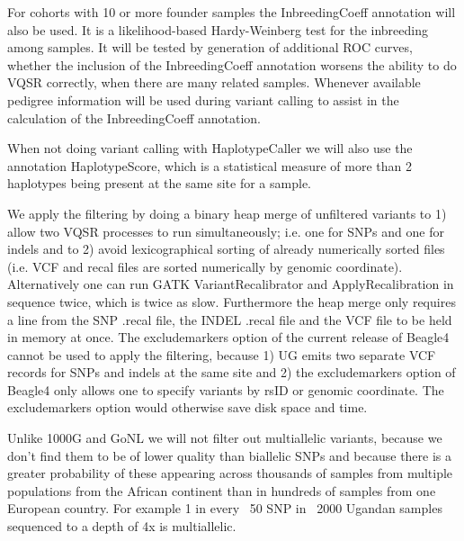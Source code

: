 For cohorts with 10 or more founder samples the InbreedingCoeff annotation will also be used. It is a likelihood-based Hardy-Weinberg test for the inbreeding among samples. It will be tested by generation of additional ROC curves, whether the inclusion of the InbreedingCoeff annotation worsens the ability to do VQSR correctly, when there are many related samples. Whenever available pedigree information will be used during variant calling to assist in the calculation of the InbreedingCoeff annotation.

When not doing variant calling with HaplotypeCaller we will also use the annotation HaplotypeScore, which is a statistical measure of more than 2 haplotypes being present at the same site for a sample.

We apply the filtering by doing a binary heap merge of unfiltered variants to 1) allow two VQSR processes to run simultaneously; i.e. one for SNPs and one for indels and to 2) avoid lexicographical sorting of already numerically sorted files (i.e. VCF and recal files are sorted numerically by genomic coordinate). Alternatively one can run GATK VariantRecalibrator and ApplyRecalibration in sequence twice, which is twice as slow. Furthermore the heap merge only requires a line from the SNP .recal file, the INDEL .recal file and the VCF file to be held in memory at once.
The excludemarkers option of the current release of Beagle4 cannot be used to apply the filtering, because 1) UG emits two separate VCF records for SNPs and indels at the same site and 2) the excludemarkers option of Beagle4 only allows one to specify variants by rsID or genomic coordinate. The excludemarkers option would otherwise save disk space and time.

Unlike 1000G and GoNL we will not filter out multiallelic variants, because we don't find them to be of lower quality than biallelic SNPs and because there is a greater probability of these appearing across thousands of samples from multiple populations from the African continent than in hundreds of samples from one European country. For example 1 in every ~50 SNP in ~2000 Ugandan samples sequenced to a depth of 4x is multiallelic.
